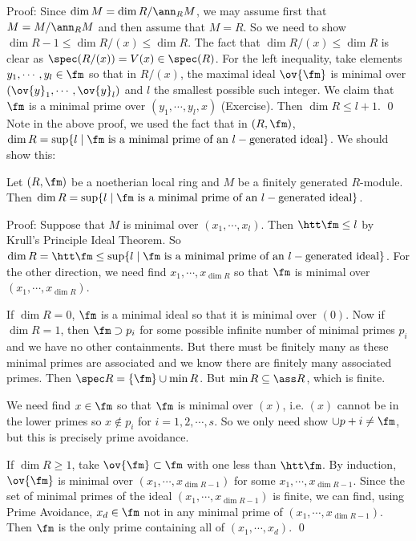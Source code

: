\noindent Proof: Since $\dim M=\dim R/\ann_R M$, we may assume first that $M=M/\ann_R M$ and then assume that $M=R$. So we need to show $\dim R-1 \leq \dim R/(x) \leq \dim R$. The fact that $\dim R/(x) \leq \dim R$ is clear as $\spec (R/(x))= V(x) \in \spec(R)$. For the left inequality, take elements $y_1,\cdots,y_l \in \fm$ so that in $R/(x)$, the maximal ideal $\ov{\fm}$ is minimal over $(\ov{y}_1,\cdots,\ov{y}_l)$ and $l$ the smallest possible such integer. We claim that $\fm$ is a minimal prime over $(y_1,\cdots,y_l,x)$ (Exercise). Then $\dim R\leq l+1$. \qed \\

Note in the above proof, we used the fact that in $(R,\fm)$, $\dim R=\sup\{l\;|\; \fm \text{ is a minimal prime of an }l-\text{generated ideal}\}$. We should show this:

\begin{prop}
Let $(R,\fm)$ be a noetherian local ring and $M$ be a finitely generated $R$-module. Then $\dim R=\sup\{l\;|\; \fm \text{ is a minimal prime of an }l-\text{generated ideal}\}$.
\end{prop}

\noindent Proof: Suppose that $M$ is minimal over $(x_1,\cdots,x_l)$. Then $\htt \fm \leq l$ by Krull's Principle Ideal Theorem. So $\dim R=\htt \fm \leq \sup\{l\;|\; \fm \text{ is a minimal prime of an }l-\text{generated ideal}\}$. For the other direction, we need find $x_1,\cdots,x_{\dim R}$ so that $\fm$ is minimal over $(x_1,\cdots,x_{\dim R})$. 

If $\dim R=0$, $\fm$ is a minimal ideal so that it is minimal over $(0)$. Now if $\dim R=1$, then $\fm \supset p_i$ for some possible infinite number of minimal primes $p_i$ and we have no other containments. But there must be finitely many as these minimal primes are associated and we know there are finitely many associated primes. Then $\spec R=\{\fm\} \cup \min R$. But $\min R \subseteq \ass R$, which is finite. 

We need find $x \in \fm$ so that $\fm$ is minimal over $(x)$, i.e. $(x)$ cannot be in the lower primes so $x \notin p_i$ for $i=1,2,\cdots,s$. So we only need show $\cup p+i \neq \fm$, but this is precisely prime avoidance. 

If $\dim R \geq 1$, take $\ov{\fm} \subset \fm$ with one less than $\htt \fm$. By induction, $\ov{\fm}$ is minimal over $(x_1,\cdots,x_{\dim R-1})$ for some $x_1,\cdots,x_{\dim R-1}$. Since the set of minimal primes of the ideal $(x_1,\cdots,x_{\dim R-1})$ is finite, we can find, using Prime Avoidance, $x_d \in \fm$ not in any minimal prime of $(x_1,\cdots,x_{\dim R-1})$. Then $\fm$ is the only prime containing all of $(x_1,\cdots,x_d)$. \qed \\

